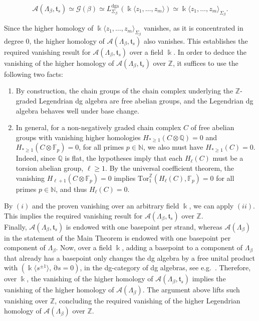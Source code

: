 \documentclass[11pt]{article}
\newcommand{\kk}{\Bbbk}
\newcommand{\ZZ}{\mathbb Z}
\newcommand{\La}{\Lambda}
\newcommand{\SA}{\mathcal A}
\newcommand{\ST}{\mathfrak t}
\newcommand{\cG}{\mathcal G}
\newcommand{\dd}{\operatorname{\partial}}
\begin{document}
\begin{equation*}
\SA(\La_\beta,\ST_{s})\simeq\cG(\beta)\simeq L^{\mathrm{dga}}_{\Sigma_\beta}(\kk\langle z_1,\ldots,z_m\rangle)\simeq \kk\langle z_1,\ldots,z_m\rangle_{\Sigma_\beta}.
\end{equation*}

\noindent Since the higher homology of $\kk\langle z_1,\ldots,z_m\rangle_{\Sigma_\beta}$ vanishes, as it is concentrated in degree 0, the higher homology of $\SA(\La_\beta,\ST_s)$ also vanishes. This establishes the required vanishing result for $\SA(\La_\beta,\ST_{s})$ over a field $\kk$. In order to deduce the vanishing of the higher homology of $\SA(\La_\beta,\ST_{s})$ over $\ZZ$, it suffices to use the following two facts:

\begin{enumerate}
    \item[(i)] By construction, the chain groups of the chain complex underlying the $\ZZ$-graded Legendrian dg algebra are free abelian groups, and the Legendrian dg algebra behaves well under base change.

    \item[(ii)] In general, for a non-negatively graded chain complex $C$ of free abelian groups with vanishing higher homologies $H_{*\geq1}(C\otimes \mathbb{Q})=0$ and $H_{*\geq1}(C\otimes \mathbb{F}_p)=0$, for all primes $p\in\mathbb{N}$, we also must have $H_{*\geq1}(C)=0$. Indeed, since $\mathbb{Q}$ is flat, the hypotheses imply that each $H_\ell(C)$ must be a torsion abelian group, $\ell\geq1$. By the universal coefficient theorem, the vanishing $H_{\ell+1}(C\otimes \mathbb{F}_p)=0$ implies $\mbox{Tor}_1^\ZZ(H_\ell(C),\mathbb{F}_p)=0$ for all primes $p\in\mathbb{N}$, and thus $H_\ell(C)=0$.
\end{enumerate}
By $(i)$ and the proven vanishing over an arbitrary field $\kk$, we can apply $(ii)$. This implies the required vanishing result for $\SA(\La_\beta,\ST_{s})$ over $\ZZ$.\\

\noindent Finally, $\SA(\La_\beta,\ST_{s})$ is endowed with one basepoint per strand, whereas $\SA(\La_\beta)$ in the statement of the Main Theorem is endowed with one basepoint per component of $\La_\beta$. Now, over a field $\kk$, adding a basepoint to a component of $\Lambda_\beta$ that already has a basepoint only changes the dg algebra by a free unital product with $(\kk\langle s^{\pm1}\rangle,\dd s=0)$, in the dg-category of dg algebras, see e.g.~\cite[Remark 3.1]{CasalsNg}. Therefore, over $\kk$, the vanishing of the higher homology of $\SA(\La_\beta,\ST_{s})$ implies the vanishing of the higher homology of $\SA(\La_\beta)$. The argument above lifts such vanishing over $\ZZ$, concluding the required vanishing of the higher Legendrian homology of $\SA(\La_\beta)$ over $\ZZ$.
\end{document}
